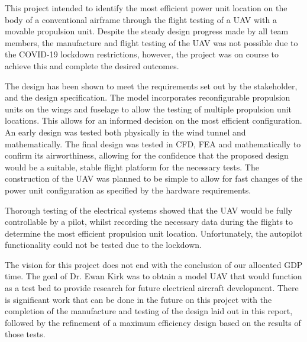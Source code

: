 \documentclass[../../main.tex]{subfiles}
\begin{document}

This project intended to identify the most efficient power unit location on the body of a conventional airframe through the flight testing of a UAV with a movable propulsion unit.
Despite the steady design progress made by all team members, the manufacture and flight testing of the UAV was not possible due to the COVID-19 lockdown restrictions, however, the project was on course to achieve this and complete the desired outcomes.  

The design has been shown to meet the requirements set out by the stakeholder, and the design specification.
The model incorporates reconfigurable propulsion units on the wings and fuselage to allow the testing of multiple propulsion unit locations.
This allows for an informed decision on the most efficient configuration.
An early design was tested both physically in the wind tunnel and mathematically.
The final design was tested in CFD, FEA and mathematically to confirm its airworthiness, allowing for the confidence that the proposed design would be a suitable, stable flight platform for the necessary tests.
The construction of the UAV was planned to be simple to allow for fast changes of the power unit configuration as specified by the hardware requirements. 

Thorough testing of the electrical systems showed that the UAV would be fully controllable by a pilot, whilst recording the necessary data during the flights to determine the most efficient propulsion unit location.
Unfortunately, the autopilot functionality could not be tested due to the lockdown.  

The vision for this project does not end with the conclusion of our allocated GDP time.
The goal of Dr. Ewan Kirk was to obtain a model UAV that would function as a test bed to provide research for future electrical aircraft development.
There is significant work that can be done in the future on this project with the completion of the manufacture and testing of the design laid out in this report, followed by the refinement of a maximum efficiency design based on the results of those tests. 
\end{document}

